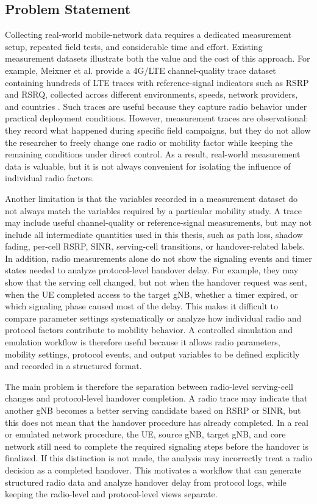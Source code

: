 \subsection{Problem Statement}

Collecting real-world mobile-network data requires a dedicated measurement setup, repeated field tests, and considerable time and effort. Existing measurement datasets illustrate both the value and the cost of this approach. For example, Meixner et al. provide a 4G/LTE channel-quality trace dataset containing hundreds of LTE traces with reference-signal indicators such as RSRP and RSRQ, collected across different environments, speeds, network providers, and countries \cite{meixner2018lte_trace}. Such traces are useful because they capture radio behavior under practical deployment conditions. However, measurement traces are observational: they record what happened during specific field campaigns, but they do not allow the researcher to freely change one radio or mobility factor while keeping the remaining conditions under direct control. As a result, real-world measurement data is valuable, but it is not always convenient for isolating the influence of individual radio factors.

Another limitation is that the variables recorded in a measurement dataset do not always match the variables required by a particular mobility study. A trace may include useful channel-quality or reference-signal measurements, but may not include all intermediate quantities used in this thesis, such as path loss, shadow fading, per-cell RSRP, SINR, serving-cell transitions, or handover-related labels. In addition, radio measurements alone do not show the signaling events and timer states needed to analyze protocol-level handover delay. For example, they may show that the serving cell changed, but not when the handover request was sent, when the UE completed access to the target gNB, whether a timer expired, or which signaling phase caused most of the delay. This makes it difficult to compare parameter settings systematically or analyze how individual radio and protocol factors contribute to mobility behavior. A controlled simulation and emulation workflow is therefore useful because it allows radio parameters, mobility settings, protocol events, and output variables to be defined explicitly and recorded in a structured format.

The main problem is therefore the separation between radio-level serving-cell changes and protocol-level handover completion. A radio trace may indicate that another gNB becomes a better serving candidate based on RSRP or SINR, but this does not mean that the handover procedure has already completed. In a real or emulated network procedure, the UE, source gNB, target gNB, and core network still need to complete the required signaling steps before the handover is finalized. If this distinction is not made, the analysis may incorrectly treat a radio decision as a completed handover. This motivates a workflow that can generate structured radio data and analyze handover delay from protocol logs, while keeping the radio-level and protocol-level views separate.

